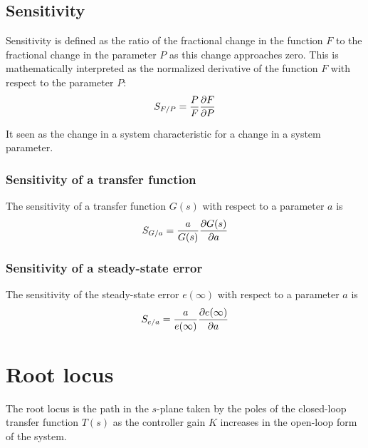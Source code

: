 \documentclass[10pt, twocolumn]{article}
\begin{document}
\subsection{Sensitivity}
Sensitivity is defined as the ratio of the fractional change in the function \(F\) to the fractional change in the parameter \(P\) as this change approaches zero.
This is mathematically interpreted as the normalized derivative of the function \(F\) with respect to the parameter \(P\):
\[
  S_{F/P} = \frac{P}{F} \frac{\partial F}{\partial P}
\]

It seen as the change in a system characteristic for a change in a system parameter.


\subsubsection{Sensitivity of a transfer function}
The sensitivity of a transfer function \(G(s)\) with respect to a parameter \(a\) is
\[
  S_{G/a} = \frac{a}{G(s)} \frac{\partial G(s)}{\partial a}
\]


\subsubsection{Sensitivity of a steady-state error}
The sensitivity of the steady-state error \(e(\infty)\) with respect to a parameter \(a\) is
\[
  S_{e/a} = \frac{a}{e(\infty)} \frac{\partial e(\infty)}{\partial a}
\]


\section{Root locus}
The root locus is the path in the \(s\)-plane taken by the poles of the closed-loop transfer function \(T(s)\) as the controller gain \(K\) increases in the open-loop form of the system.
\end{document}
